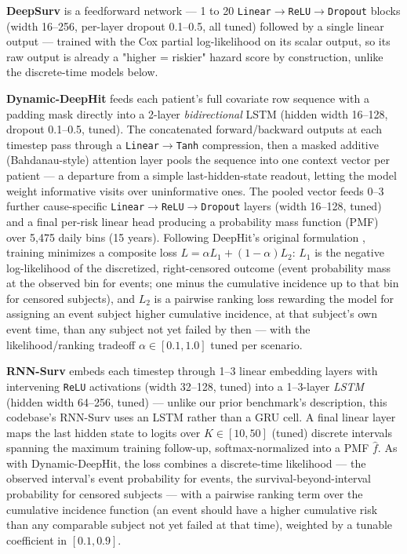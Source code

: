 \documentclass[10pt,letterpaper]{article}
\begin{document}
\textbf{DeepSurv} \cite{katzman2018deepsurv} is a feedforward network — 1 to 20 \texttt{Linear}$\to$\texttt{ReLU}$\to$\texttt{Dropout} blocks (width 16--256, per-layer dropout 0.1--0.5, all tuned) followed by a single linear output — trained with the Cox partial log-likelihood on its scalar output, so its raw output is already a "higher = riskier" hazard score by construction, unlike the discrete-time models below.

\textbf{Dynamic-DeepHit} \cite{lee2020dynamicdeephit,lee2018deephit} feeds each patient's full covariate row sequence with a padding mask directly into a 2-layer \emph{bidirectional} LSTM (hidden width 16--128, dropout 0.1--0.5, tuned). The concatenated forward/backward outputs at each timestep pass through a \texttt{Linear}$\to$\texttt{Tanh} compression, then a masked additive (Bahdanau-style) attention layer pools the sequence into one context vector per patient — a departure from a simple last-hidden-state readout, letting the model weight informative visits over uninformative ones. The pooled vector feeds 0--3 further cause-specific \texttt{Linear}$\to$\texttt{ReLU}$\to$\texttt{Dropout} layers (width 16--128, tuned) and a final per-risk linear head producing a probability mass function (PMF) over 5{,}475 daily bins (15 years). Following DeepHit's original formulation \cite{lee2018deephit}, training minimizes a composite loss $L=\alpha L_1+(1-\alpha)L_2$: $L_1$ is the negative log-likelihood of the discretized, right-censored outcome (event probability mass at the observed bin for events; one minus the cumulative incidence up to that bin for censored subjects), and $L_2$ is a pairwise ranking loss rewarding the model for assigning an event subject higher cumulative incidence, at that subject's own event time, than any subject not yet failed by then — with the likelihood/ranking tradeoff $\alpha\in[0.1,1.0]$ tuned per scenario.

\textbf{RNN-Surv} \cite{giunchiglia2018rnn_surv} embeds each timestep through 1--3 linear embedding layers with intervening \texttt{ReLU} activations (width 32--128, tuned) into a 1--3-layer \emph{LSTM} (hidden width 64--256, tuned) — unlike our prior benchmark's description, this codebase's RNN-Surv uses an LSTM rather than a GRU cell. A final linear layer maps the last hidden state to logits over $K\in[10,50]$ (tuned) discrete intervals spanning the maximum training follow-up, softmax-normalized into a PMF $\hat{f}$. As with Dynamic-DeepHit, the loss combines a discrete-time likelihood — the observed interval's event probability for events, the survival-beyond-interval probability for censored subjects — with a pairwise ranking term over the cumulative incidence function (an event should have a higher cumulative risk than any comparable subject not yet failed at that time), weighted by a tunable coefficient in $[0.1,0.9]$.
\end{document}
